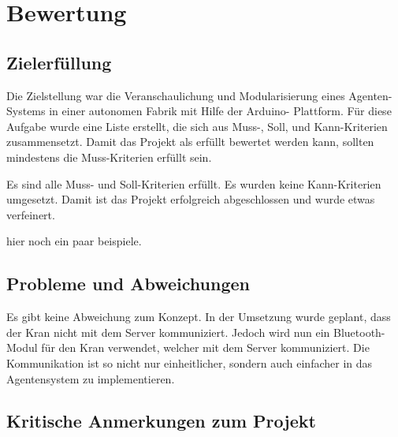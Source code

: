 \chapter{Bewertung}


\section{Zielerfüllung}

Die Zielstellung war die Veranschaulichung und Modularisierung eines Agenten-Systems in einer autonomen Fabrik mit Hilfe der Arduino- Plattform. Für diese Aufgabe wurde eine Liste erstellt, die sich aus Muss-, Soll, und Kann-Kriterien zusammensetzt. Damit das Projekt als erfüllt bewertet werden kann, sollten mindestens die Muss-Kriterien erfüllt sein.

Es sind alle Muss- und Soll-Kriterien erfüllt. Es wurden keine Kann-Kriterien umgesetzt. Damit ist das Projekt erfolgreich abgeschlossen und wurde etwas verfeinert.

hier noch ein paar beispiele.

\section{Probleme und Abweichungen}

Es gibt keine Abweichung zum Konzept. In der Umsetzung wurde geplant, dass der Kran nicht mit dem Server kommuniziert. Jedoch wird nun ein Bluetooth-Modul für den Kran verwendet, welcher mit dem Server kommuniziert. Die Kommunikation ist so nicht nur einheitlicher, sondern auch einfacher in das Agentensystem zu implementieren.

\section{Kritische Anmerkungen zum Projekt}

